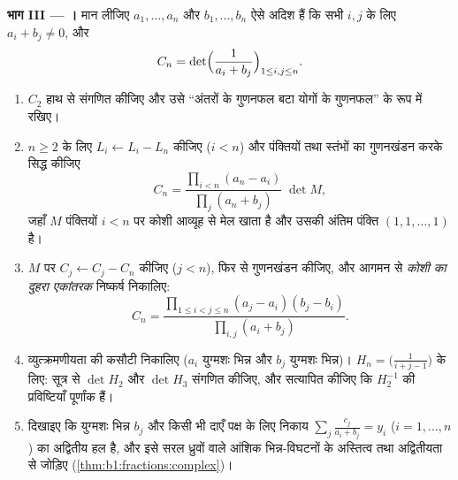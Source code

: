\begin{problem}
\medskip \noindent\textbf{भाग III --- ।} मान लीजिए $a_1, \dots,
a_n$ और $b_1, \dots, b_n$ ऐसे अदिश हैं कि सभी $i, j$ के लिए $a_i + b_j \neq
0$, और
\[
C_n = \det\Bigl(\frac{1}{a_i + b_j}\Bigr)_{1 \leq i, j \leq n} .
\]
\begin{enumerate}[resume]
  \item $C_2$ हाथ से संगणित कीजिए और उसे ``अंतरों के गुणनफल बटा योगों के
  गुणनफल'' के रूप में रखिए।
  \item $n \geq 2$ के लिए $L_i \leftarrow L_i - L_n$ कीजिए ($i < n$) और
  पंक्तियों तथा स्तंभों का गुणनखंडन करके सिद्ध कीजिए
        \[
        C_n = \frac{\prod_{i<n}(a_n - a_i)}{\prod_{j}(a_n +
        b_j)}\;\det M,
        \]
        जहाँ $M$ पंक्तियों $i < n$ पर कोशी आव्यूह से मेल खाता है और उसकी
        अंतिम पंक्ति $(1, 1, \dots, 1)$ है।
  \item $M$ पर $C_j \leftarrow C_j - C_n$ कीजिए ($j < n$), फिर से गुणनखंडन
  कीजिए, और आगमन से \emph{कोशी का दुहरा एकांतरक} निष्कर्ष निकालिए:
        \[
        C_n = \frac{\prod_{1 \leq i < j \leq n}(a_j - a_i)(b_j -
        b_i)}{\prod_{i, j}(a_i + b_j)} .
        \]
  \item व्युत्क्रमणीयता की कसौटी निकालिए ($a_i$ युग्मशः भिन्न और $b_j$
  युग्मशः भिन्न)। \emph{} $H_n = \bigl(\frac{1}{i + j -
  1}\bigr)$ के लिए: सूत्र से $\det H_2$ और $\det H_3$ संगणित कीजिए, और
  सत्यापित कीजिए कि $H_2^{-1}$ की प्रविष्टियाँ पूर्णांक हैं।
  \item दिखाइए कि युग्मशः भिन्न $b_j$ और किसी भी दाएँ पक्ष के लिए निकाय
  $\sum_j \frac{c_j}{a_i + b_j} = y_i$ ($i = 1, \dots, n$) का अद्वितीय हल
  है, और इसे सरल ध्रुवों वाले आंशिक भिन्न-विघटनों के अस्तित्व तथा अद्वितीयता
  से जोड़िए (\cref{thm:b1:fractions:complex})।
\end{enumerate}


\end{problem}
